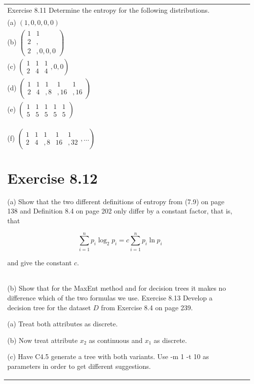 \documentclass[10pt]{book}
\begin{document}
\begin{center}
\begin{tabular}{|l|l|l|}
Exercise 8.11 Determine the entropy for the following distributions.\\
(a) $(1,0,0,0,0)$\\
(b) $\left(\begin{array}{ll}1 & 1 \\ 2 & , \\ 2 & , 0,0,0\end{array}\right)$\\
(c) $\left(\begin{array}{ccc}1 & 1 & 1 \\ 2 & 4 & 4\end{array}, 0,0\right)$\\
(d) $\left(\begin{array}{ccccc}1 & 1 & 1 & 1 & 1 \\ 2 & 4 & , 8 & , 16 & , 16\end{array}\right)$\\
(e) $\left(\begin{array}{ccccc}1 & 1 & 1 & 1 & 1 \\ 5 & 5 & 5 & 5 & 5\end{array}\right)$\\
(f) $\left(\begin{array}{ccccc}1 & 1 & 1 & 1 & 1 \\ 2 & 4 & , 8 & 16 & , 32\end{array}, \ldots\right)$

\section{Exercise 8.12}
(a) Show that the two different definitions of entropy from (7.9) on page 138 and Definition 8.4 on page 202 only differ by a constant factor, that is, that

$$
\sum_{i=1}^{n} p_{i} \log _{2} p_{i}=c \sum_{i=1}^{n} p_{i} \ln p_{i}
$$

and give the constant $c$.\\
(b) Show that for the MaxEnt method and for decision trees it makes no difference which of the two formulas we use.
Exercise 8.13 Develop a decision tree for the dataset $D$ from Exercise 8.4 on page 239.

(a) Treat both attributes as discrete.

(b) Now treat attribute $x_{2}$ as continuous and $x_{1}$ as discrete.

(c) Have C4.5 generate a tree with both variants. Use -m 1 -t 10 as parameters in order to get different suggestions.


\end{tabular}
\end{center}
\end{document}
